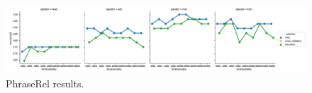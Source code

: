 \begin{figure}
  \centering

    \includegraphics[width=\textwidth]{supplement/figures/phraserel-results}
  \caption{PhraseRel results.}
  \label{fig:phraserel-results}
\end{figure}

